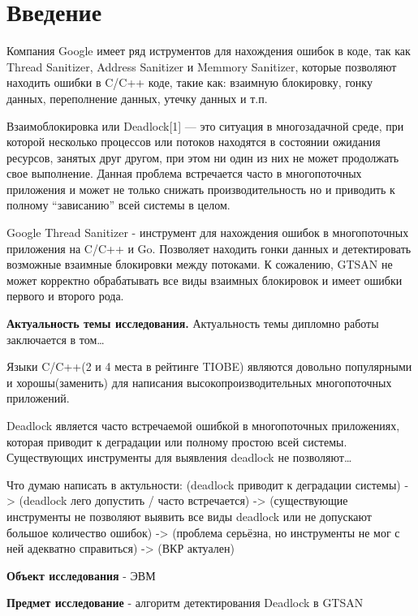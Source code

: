 
\section*{Введение}

Компания Google имеет ряд иструментов для нахождения ошибок в коде, так как Thread Sanitizer, Address Sanitizer и Memmory Sanitizer, которые позволяют находить ошибки в C/C++ коде, такие как: взаимную блокировку, гонку данных, переполнение данных, утечку данных и т.п. 

Взаимоблокировка или Deadlock[1] — это ситуация в многозадачной среде, при которой несколько процессов или потоков находятся в состоянии ожидания ресурсов, занятых друг другом, при этом ни один из них не может продолжать свое выполнение. Данная проблема встречается часто в многопоточных приложения и может не только снижать производительность но и приводить к полному “зависанию” всей системы в целом.

Google Thread Sanitizer - инструмент для нахождения ошибок в многопоточных приложения на C/C++ и Go. Позволяет находить гонки данных и детектировать возможные взаимные блокировки между потоками. К сожалению, GTSAN не может корректно обрабатывать все виды взаимных блокировок и имеет ошибки первого и второго рода.

\textbf{Актуальность темы исследования.} Актуальность темы дипломно работы заключается в том\dots

Языки C/C++(2 и 4 места в рейтинге TIOBE) являются довольно популярными и хорошы(заменить) для написания высокопроизводительных многопоточных приложений. 

Deadlock является часто встречаемой ошибкой в многопоточных приложениях, которая приводит к деградации или полному простою всей системы. Существующих инструменты для выявления deadlock не позволяют\dots

Что думаю написать в актульности: (deadlock приводит к деградации системы) -> (deadlock лего допустить / часто встречается) -> (существующие инструменты не позволяют выявить все виды deadlock или не допускают большое количество ошибок) -> (проблема серьёзна, но инструменты не мог с ней адекватно справиться) -> (ВКР актуален)

\textbf{Объект исследования} - ЭВМ

\textbf{Предмет исследование} - алгоритм детектирования Deadlock в GTSAN

